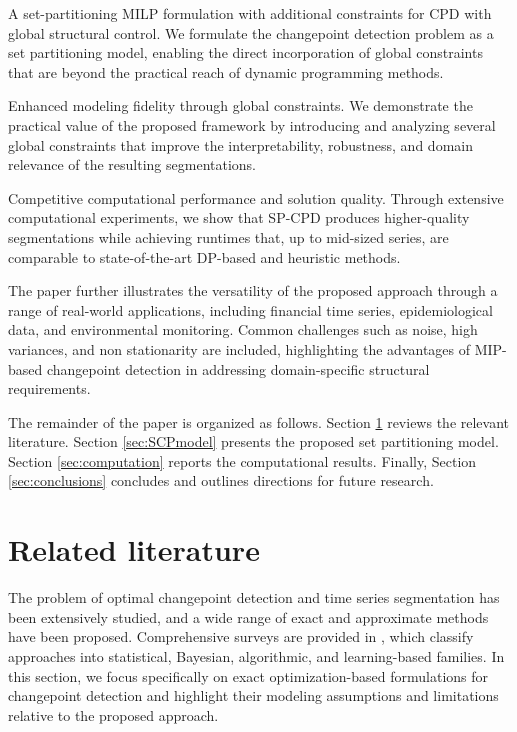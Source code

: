 \documentclass[preprints,article,submit,pdftex,moreauthors]{Definitions/mdpi}
\begin{document}
A set-partitioning MILP formulation with additional constraints for CPD with global structural control.
We formulate the changepoint detection problem as a set partitioning model, enabling the direct incorporation of global constraints that are beyond the practical reach of dynamic programming methods.

Enhanced modeling fidelity through global constraints.
We demonstrate the practical value of the proposed framework by introducing and analyzing several global constraints that improve the interpretability, robustness, and domain relevance of the resulting segmentations.


Competitive computational performance and solution quality.
Through extensive computational experiments, we show that SP-CPD produces higher-quality segmentations while achieving runtimes that, up to mid-sized series, are comparable to state-of-the-art DP-based and heuristic methods.

The paper further illustrates the versatility of the proposed approach through a range of real-world applications, including financial time series, epidemiological data, and environmental monitoring. Common challenges such as noise, high variances, and non stationarity are included, highlighting the advantages of MIP-based changepoint detection in addressing domain-specific structural requirements.

The remainder of the paper is organized as follows. Section \ref{sec:literature} reviews the relevant literature. Section \ref{sec:SCPmodel} presents the proposed set partitioning model. Section \ref{sec:computation} reports the computational results. Finally, Section \ref{sec:conclusions} concludes and outlines directions for future research.

\section{Related literature} 					\label{sec:literature}
The problem of optimal changepoint detection and time series segmentation has been extensively studied, and a wide range of exact and approximate methods have been proposed. Comprehensive surveys are provided in \cite{AC17,TOV20}, which classify approaches into statistical, Bayesian, algorithmic, and learning-based families. In this section, we focus specifically on exact optimization-based formulations for changepoint detection and highlight their modeling assumptions and limitations relative to the proposed approach.
\end{document}
